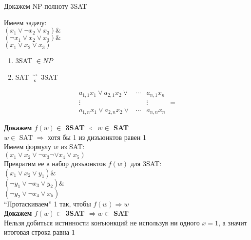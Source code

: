 \documentclass{beamer}
\theoremstyle{definition}
\begin{document}
\begin{frame}{Докажем NP-полноту 3SAT}

	\begin{center}
	Имеем задачу:\\
	$(x_1 \lor \neg x_2 \lor x_3) \&$\\
	$(\neg x_1 \lor x_2 \lor x_3) \&$\\
	$(x_1 \lor x_2 \lor x_3)$
	\end{center}
	
	\begin{enumerate}
		\item 3SAT $\in NP$
		\item SAT $\leadsto\atop c$ 3SAT
	\end{enumerate}
		\begin{displaymath}
		\begin{matrix}\nonumber
  		a_{1,1} x_1 \lor a_{2,1} x_2  \lor & \cdots & a_{n,1} x_n\nonumber\\
  		\vdots & & \vdots\nonumber\\
  		a_{1,n} x_1 \lor a_{2,n} x_2  \lor & \cdots & a_{n,n} x_n\nonumber	
		\end{matrix}
		=
	\end{displaymath}
		
	
\end{frame}
\begin{frame}{}
	\begin{center}
		\textbf{Докажем $f(w) \in$ 3SAT $\Leftarrow w \in$ SAT}\\
		$w \in$ SAT $\Rightarrow$ хотя бы 1 из дизъюнктов равен 1 \\
		Имеем формулу $w$ из SAT:\\
		$(x_1 \lor x_2 \lor \neg x_3 \neg\lor x_4 \lor x_5)$\\
		Превратим ее в набор дизъюнктов $f(w)$ для 3SAT:\\
		$(x_1 \lor x_2 \lor y_1) \&$\\
		$(\neg y_1 \lor \neg x_3 \lor y_2)\&$\\
		$(\neg y_2 \lor \neg x_4 \lor x_5)$\\
		``Протаскиваем'' 1 так, чтобы $f(w) \Rightarrow w$\\
		
		\textbf{Докажем $f(w) \in$ 3SAT $\Rightarrow w \in$ SAT}\\
		Нельзя добиться истинности конъюнкций не используя ни одного $x=1$, а значит итоговая строка равна 1	
 	\end{center}	
\end{frame}
\end{document}
